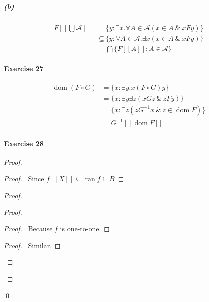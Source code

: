 \documentclass{report}
\newcommand{\dom}{\ensuremath{\operatorname{dom}}}
\newcommand{\ran}{\ensuremath{\operatorname{ran}}}
\begin{document}
    \subparagraph{(b)}
    \begin{align*}
        F [\![ \bigcup \mathcal{A} ] \! ]
        & = \{ y : \exists x. \forall A \in \mathcal{A} (x \in A \ \&\ xFy) \} \\
        & \subseteq \{ y : \forall A \in \mathcal{A}. \exists x (x \in A \ \&\ xFy) \} \\
        & = \bigcap \{ F [\![ A ]\!] : A \in \mathcal{A} \}
    \end{align*}

    \paragraph{Exercise 27}
    \begin{align*}
        \dom (F \circ G) & = \{ x : \exists y. x(F \circ G) y \} \\
        & = \{ x : \exists y \exists z(xGz \ \&\ zFy) \} \\
        & = \{ x : \exists z(zG^{-1}x\ \&\ z \in \dom F) \} \\
        & = G^{-1}[\![ \dom F ]\!]
    \end{align*}

    \paragraph{Exercise 28}
    \begin{proof}
        \pf
        \begin{proof}
            \pf\ Since $f[\![X]\!] \subseteq \ran f \subseteq B$
        \end{proof}
        \begin{proof}
            \begin{proof}
                \begin{proof}
                    \pf\ Because $f$ is one-to-one.
                \end{proof}
                \begin{proof}
                    \pf\ Similar.
                \end{proof}
            \end{proof}
        \end{proof}
        \qed
    \end{proof}
\end{document}
